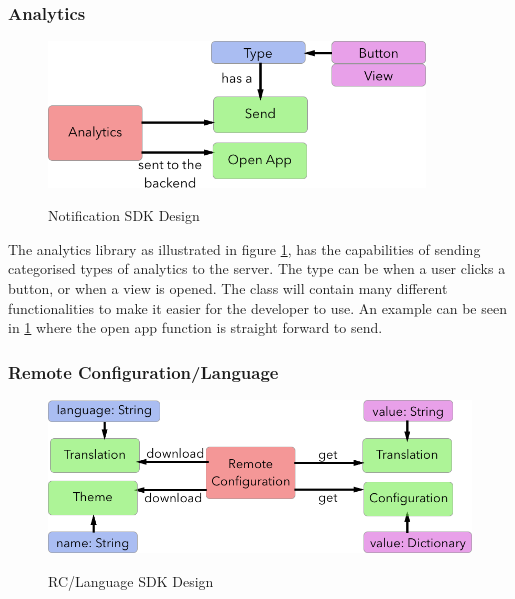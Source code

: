 \subsubsection{Analytics} \label{d-sdk:analytics}

\begin{figure}[!h]
    \caption{Notification SDK Design}
    \centering
    \includegraphics[width=100mm]{images/design/analytics}
    \label{fig:analytics_design}
\end{figure}

The analytics library as illustrated in figure \ref{fig:analytics_design}, has the capabilities of sending categorised types of analytics to the server. The type can be when a user clicks a button, or when a view is opened. The class will contain many different functionalities to make it easier for the developer to use. An example can be seen in \ref{fig:analytics_design} where the open app function is straight forward to send.

\subsubsection{Remote Configuration/Language} \label{d-sdk:rc_l}

\begin{figure}[!h]
    \caption{RC/Language SDK Design}
    \centering
    \includegraphics[width=120mm]{images/design/remote_config}
    \label{fig:remote_config_design}
\end{figure}


